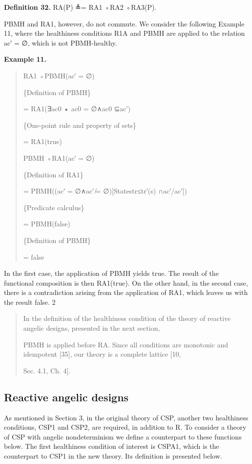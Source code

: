\documentclass[11pt]{article}
\begin{document}
\noindent\textbf{Definition 32.} RA(P) ≜= RA1 ◦RA2 ◦RA3(P).


PBMH and RA1, however, do not commute. We consider the following Example 11, where the healthiness conditions R1A and PBMH are applied to the relation ac′ = ∅, which is not PBMH-healthy.

\noindent\textbf{Example 11.}


\begin{quote}\small\raggedright
RA1 ◦PBMH(ac′ = ∅)
\par
\{Definition of PBMH\}
\par
= RA1(∃ac0 • ac0 = ∅∧ac0 ⊆ac′)
\par
\{One-point rule and property of sets\}
\par
= RA1(true)
\par
PBMH ◦RA1(ac′ = ∅)
\par
\{Definition of RA1\}
\par
= PBMH((ac′ = ∅∧ac′ ̸= ∅)[Statestr≤tr′(s) ∩ac′/ac′])
\par
\{Predicate calculus\}
\par
= PBMH(false)
\par
\{Definition of PBMH\}
\par
= false
\end{quote}

In the first case, the application of PBMH yields true. The result of the functional composition is then RA1(true). On the other hand, in the second case, there is a contradiction arising from the application of RA1, which leaves us with the result false. 2

\begin{quote}\small\raggedright
In the definition of the healthiness condition of the theory of reactive angelic designs, presented in the next section,
\par
PBMH is applied before RA. Since all conditions are monotonic and idempotent [35], our theory is a complete lattice [10,
\par
Sec. 4.1, Ch. 4].
\end{quote}

\subsection{Reactive angelic designs}
As mentioned in Section 3, in the original theory of CSP, another two healthiness conditions, CSP1 and CSP2, are required, in addition to R. To consider a theory of CSP with angelic nondeterminism we define a counterpart to these functions below. The first healthiness condition of interest is CSPA1, which is the counterpart to CSP1 in the new theory. Its definition is presented below.
\end{document}
